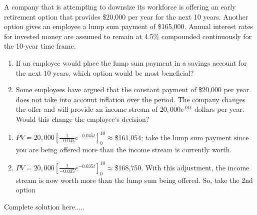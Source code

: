 \begin{example}
A company that is attempting to downsize its workforce is offering an early retirement option that provides \$20,000 per year for the next 10 years. Another option gives an employee a lump sum payment of \$165,000.  Annual interest rates for invested money are assumed to remain at 4.5\% compounded continuously for the 10-year time frame.  
\renewcommand{\labelenumi}{\textbf{(\alph{enumi})}}
    \begin{enumerate}[leftmargin=*]
    \item If an employee would place the lump sum payment in a savings account for the next 10 years, which option would be most beneficial? 
    \item Some employees have argued that the constant payment of \$20,000 per year does not take into account inflation over the period.  The company changes the offer and will provide an income stream of $20,000e^{.01t}$ dollars per year.  Would this change the employee’s decision? 
    \end{enumerate}
    \begin{sol}
    \renewcommand{\labelenumi}{\textbf{(\alph{enumi})}}
    \begin{enumerate}[leftmargin=*]
    \item $PV=20,000\left[\displaystyle\frac{1}{-0.045}e^{-0.045t}\right]_0^{10}\approx$\$161,054; take the lump sum payment since you are being offered more than the income stream is currently worth.
    \item  $PV=20,000\left[\displaystyle\frac{1}{-0.035}e^{-0.035t}\right]_0^{10}\approx$\$168,750. With this adjustment, the income stream is now worth more than the lump sum being offered. So, take the 2nd option
    \end{enumerate}
    \end{sol}
    \begin{solL}
    Complete solution here.....
    
    \end{solL}
    
\end{example}

